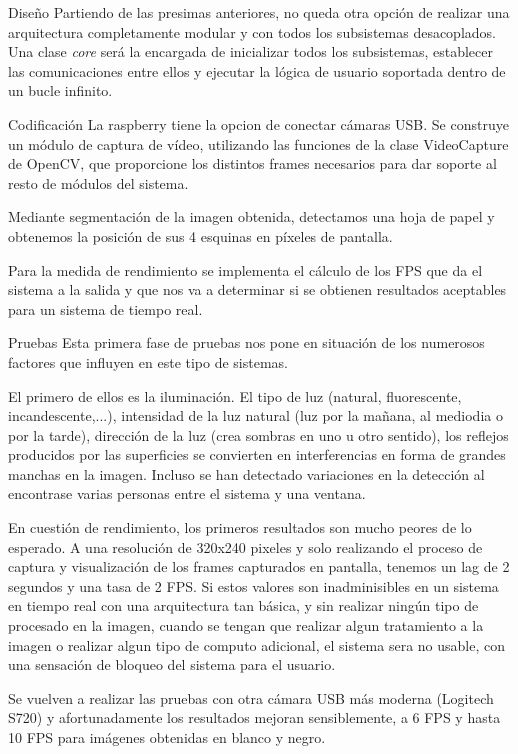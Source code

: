 Diseño 
Partiendo de las presimas anteriores, no queda otra opción de realizar una arquitectura completamente modular y con todos los subsistemas desacoplados. Una clase \emph{core} será la encargada de inicializar todos los subsistemas, establecer las comunicaciones entre ellos y ejecutar la lógica de usuario soportada dentro de un bucle infinito.

Codificación
La raspberry tiene la opcion de conectar cámaras USB. Se construye un módulo de captura de vídeo, utilizando las funciones de la clase VideoCapture de OpenCV, que proporcione los distintos frames necesarios para dar soporte al resto de módulos del sistema. 

Mediante segmentación de la imagen obtenida, detectamos una hoja de papel y obtenemos la posición de sus 4 esquinas en píxeles de pantalla.

Para la medida de rendimiento se implementa el cálculo de los FPS que da el sistema a la salida y que nos va a determinar si se obtienen resultados aceptables para un sistema de tiempo real.

Pruebas
Esta primera fase de pruebas nos pone en situación de los numerosos factores que influyen en este tipo de sistemas.

El primero de ellos es la iluminación. El tipo de luz (natural, fluorescente, incandescente,...), intensidad de la luz natural (luz por la mañana, al mediodia o por la tarde), dirección de la luz (crea sombras en uno u otro sentido), los reflejos producidos por las superficies se convierten en interferencias en forma de grandes manchas en la imagen. Incluso se han detectado variaciones en la detección al encontrase varias personas entre el sistema y una ventana.

En cuestión de rendimiento, los primeros resultados son mucho peores de lo esperado. A una resolución de 320x240 pixeles y solo realizando el proceso de captura y visualización de los frames capturados en pantalla, tenemos un lag de 2 segundos y una tasa de 2 FPS. Si estos valores son inadminisibles en un sistema en tiempo real con una arquitectura tan básica, y sin realizar ningún tipo de procesado en la imagen, cuando se tengan que realizar algun tratamiento a la imagen o realizar algun tipo de computo adicional, el sistema sera no usable, con una sensación de bloqueo del sistema para el usuario.   

Se vuelven a realizar las pruebas con otra cámara USB más moderna (Logitech S720) y afortunadamente los resultados mejoran sensiblemente, a 6 FPS y hasta 10 FPS para imágenes obtenidas en blanco y negro. 

